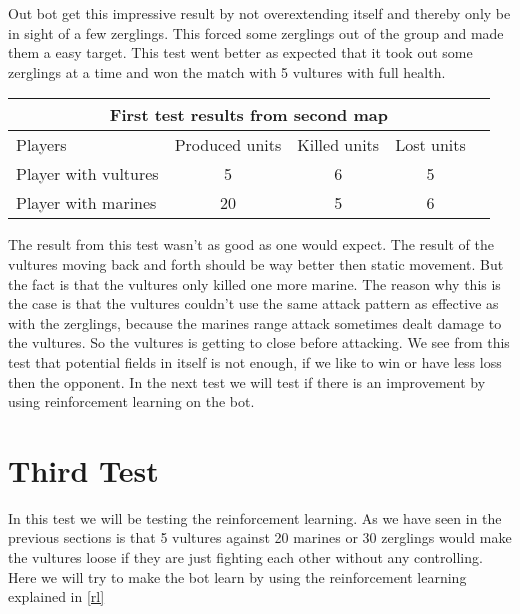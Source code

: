 Out bot get this impressive result by not overextending itself and thereby only be in sight of a few zerglings. This forced some zerglings out of the group and made them a easy target. This test went better as expected that it took out some zerglings at a time and won the match with 5 vultures with full health.\\

\begin{centering}
 \begin{tabular}{|l||c|c|c|c|}
	\multicolumn{5}{c}{First test results from second map} \\
	\hline
	Players & Produced units & Killed units & Lost units\\
	\hline
	\hline
		Player with vultures & 5 & 6 & 5\\
	\hline
		Player with marines & 20 & 5 & 6\\
	\hline

\end{tabular}
\end{centering}


The result from this test wasn't as good as one would expect. The result of the vultures moving back and forth should be way better then static movement. But the fact is that the vultures only killed one more marine. The reason why this is the case is that the vultures couldn't use the same attack pattern as effective as with the zerglings, because the marines range attack sometimes dealt damage to the vultures. So the vultures is getting to close before attacking.
We see from this test that potential fields in itself is not enough, if we like to win or have less loss then the opponent. In the next test we will test if there is an improvement by using reinforcement learning on the bot.

\section{Third Test}
In this test we will be testing the reinforcement learning. As we have seen in the previous sections is that 5 vultures against 20 marines or 30 zerglings would make the vultures loose if they are just fighting each other without any controlling. Here we will try to make the bot learn by using the reinforcement learning explained in \ref{rl} 





